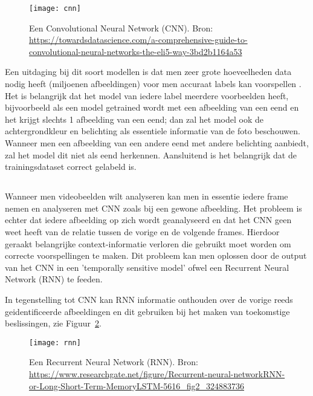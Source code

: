\begin{figure}
    \centering
    \texttt{[image: cnn]}
    \caption{Een Convolutional Neural Network (CNN). Bron: \url{https://towardsdatascience.com/a-comprehensive-guide-to-convolutional-neural-networks-the-eli5-way-3bd2b1164a53}}
    \label{fig:cnn}
\end{figure}

Een uitdaging bij dit soort modellen is dat men zeer grote hoeveelheden data nodig heeft (miljoenen afbeeldingen) voor men accuraat labels kan voorspellen \autocite{Chen2014}. Het is belangrijk dat het model van iedere label meerdere voorbeelden heeft, bijvoorbeeld als een model getrained wordt met een afbeelding van een eend en het krijgt slechts 1 afbeelding van een eend; dan zal het model ook de achtergrondkleur en belichting als essentiele informatie van de foto beschouwen. Wanneer men een afbeelding van een andere eend met andere belichting aanbiedt, zal het model dit niet als eend herkennen. Aansluitend is het belangrijk dat de trainingsdataset correct gelabeld is.

\subsection{}
\label{sec:recurrent-neural-network}
Wanneer men videobeelden wilt analyseren kan men in essentie iedere frame nemen en analyseren met CNN zoals bij een gewone afbeelding. Het probleem is echter dat iedere afbeelding op zich wordt geanalyseerd en dat het CNN geen weet heeft van de relatie tussen de vorige en de volgende frames. Hierdoor geraakt belangrijke context-informatie verloren die gebruikt moet worden om correcte voorspellingen te maken.
Dit probleem kan men oplossen door de output van het CNN in een 'temporally sensitive model' ofwel een Recurrent Neural Network (RNN) te feeden.

In tegenstelling tot CNN kan RNN informatie onthouden over de vorige reeds geidentificeerde afbeeldingen en dit gebruiken bij het maken van toekomstige beslissingen, zie Figuur~\ref{fig:rnn}.

\begin{figure}
    \centering
    \texttt{[image: rnn]}
    \caption{Een Recurrent Neural Network (RNN). Bron: \url{https://www.researchgate.net/figure/Recurrent-neural-networkRNN-or-Long-Short-Term-MemoryLSTM-5616_fig2_324883736}}
    \label{fig:rnn}
\end{figure}